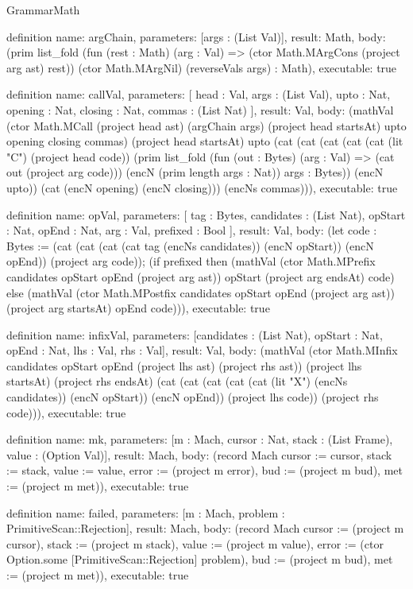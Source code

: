 \begin{lexlean}{GrammarMath}
\begin{semanticmodule}
definition{
  name: argChain,
  parameters: [args : (List Val)],
  result: Math,
  body: (prim list_fold (fun (rest : Math) (arg : Val) => (ctor Math.MArgCons (project arg ast) rest)) (ctor Math.MArgNil) (reverseVals args) : Math),
  executable: true
}

definition{
  name: callVal,
  parameters: [
    head : Val,
    args : (List Val),
    upto : Nat,
    opening : Nat,
    closing : Nat,
    commas : (List Nat)
  ],
  result: Val,
  body: (mathVal (ctor Math.MCall (project head ast) (argChain args) (project head startsAt) upto opening closing commas) (project head startsAt) upto (cat (cat (cat (cat (cat (lit "C") (project head code)) (prim list_fold (fun (out : Bytes) (arg : Val) => (cat out (project arg code))) (encN (prim length args : Nat)) args : Bytes)) (encN upto)) (cat (encN opening) (encN closing))) (encNs commas))),
  executable: true
}

definition{
  name: opVal,
  parameters: [
    tag : Bytes,
    candidates : (List Nat),
    opStart : Nat,
    opEnd : Nat,
    arg : Val,
    prefixed : Bool
  ],
  result: Val,
  body: (let code : Bytes := (cat (cat (cat (cat tag (encNs candidates)) (encN opStart)) (encN opEnd)) (project arg code)); (if prefixed then (mathVal (ctor Math.MPrefix candidates opStart opEnd (project arg ast)) opStart (project arg endsAt) code) else (mathVal (ctor Math.MPostfix candidates opStart opEnd (project arg ast)) (project arg startsAt) opEnd code))),
  executable: true
}

definition{
  name: infixVal,
  parameters: [candidates : (List Nat), opStart : Nat, opEnd : Nat, lhs : Val, rhs : Val],
  result: Val,
  body: (mathVal (ctor Math.MInfix candidates opStart opEnd (project lhs ast) (project rhs ast)) (project lhs startsAt) (project rhs endsAt) (cat (cat (cat (cat (cat (lit "X") (encNs candidates)) (encN opStart)) (encN opEnd)) (project lhs code)) (project rhs code))),
  executable: true
}

definition{
  name: mk,
  parameters: [m : Mach, cursor : Nat, stack : (List Frame), value : (Option Val)],
  result: Mach,
  body: (record Mach {cursor := cursor, stack := stack, value := value, error := (project m error), bud := (project m bud), met := (project m met)}),
  executable: true
}

definition{
  name: failed,
  parameters: [m : Mach, problem : PrimitiveScan::Rejection],
  result: Mach,
  body: (record Mach {cursor := (project m cursor), stack := (project m stack), value := (project m value), error := (ctor Option.some [PrimitiveScan::Rejection] problem), bud := (project m bud), met := (project m met)}),
  executable: true
}


\end{semanticmodule}
\end{lexlean}
